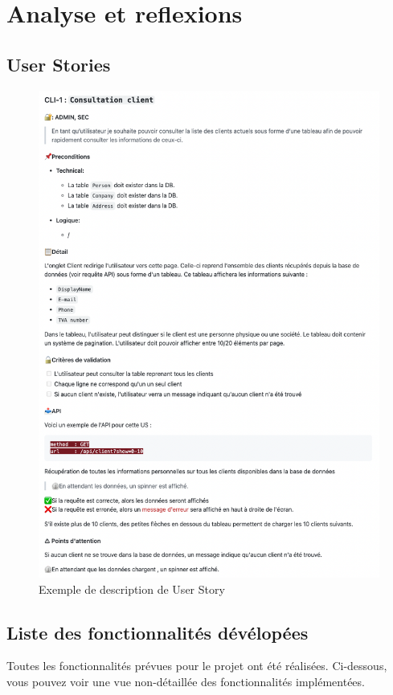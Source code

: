 \section{Analyse et reflexions }
\subsection{User Stories}

\begin{figure}[H]
    \centering
    \includegraphics[scale=0.85]{img/userstories.png}
    \caption{Exemple de description de User Story}
    \label{Description user story}
  \end{figure}
\subsection{Liste des fonctionnalités dévélopées}
Toutes les fonctionnalités prévues pour le projet ont été réalisées. 
Ci-dessous, vous pouvez voir une vue non-détaillée des fonctionnalités implémentées.

